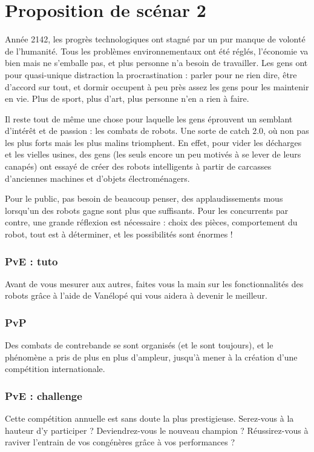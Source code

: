 \documentclass[10pt]{article}
\begin{document}
\section*{Proposition de scénar 2}

Année 2142, les progrès technologiques ont stagné par un pur manque de volonté de l'humanité. Tous les problèmes environnementaux ont été réglés, l'économie va bien mais ne s'emballe pas, et plus personne n'a besoin de travailler.
Les gens ont pour quasi-unique distraction la procrastination : parler pour ne rien dire, être d'accord sur tout, et dormir occupent à peu près assez les gens pour les maintenir en vie. Plus de sport, plus d'art, plus personne n'en a rien à faire.

Il reste tout de même une chose pour laquelle les gens éprouvent un semblant d'intérêt et de passion : les combats de robots. Une sorte de catch 2.0, où non pas les plus forts mais les plus malins triomphent.
En effet, pour vider les décharges et les vielles usines, des gens (les seuls encore un peu motivés à se lever de leurs canapés) ont essayé de créer des robots intelligents à partir de carcasses d'anciennes machines et d'objets électroménagers.

Pour le public, pas besoin de beaucoup penser, des applaudissements mous lorsqu'un des robots gagne sont plus que suffisants. Pour les concurrents par contre, une grande réflexion est nécessaire : choix des pièces, comportement du robot, tout est à déterminer, et les possibilités sont énormes !\\

\subsubsection*{PvE : tuto}
Avant de vous mesurer aux autres, faites vous la main sur les fonctionnalités des robots grâce à l'aide de Vanélopé qui vous aidera à devenir le meilleur.

\subsubsection*{PvP}
Des combats de contrebande se sont organisés (et le sont toujours), et le phénomène a pris de plus en plus d'ampleur, jusqu'à mener à la création d'une compétition internationale.

\subsubsection*{PvE : challenge}
Cette compétition annuelle est sans doute la plus prestigieuse. Serez-vous à la hauteur d'y participer ? Deviendrez-vous le nouveau champion ? Réussirez-vous à raviver l'entrain de vos congénères grâce à vos performances ?
\end{document}
